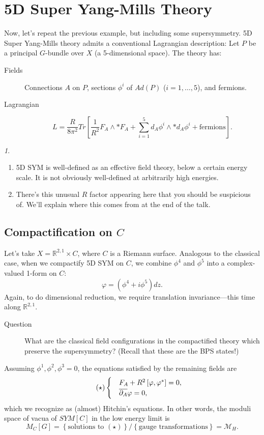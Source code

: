 \documentclass[oneside,english]{amsbook}
\numberwithin{section}{chapter}
\numberwithin{equation}{section}
\numberwithin{figure}{section}
\theoremstyle{plain}
\theoremstyle{definition}
\theoremstyle{remark}
\newtheorem*{rem*}{\protect\remarkname}
\theoremstyle{definition}
\theoremstyle{definition}
\theoremstyle{plain}
\providecommand{\remarkname}{Remark}
\begin{document}
\section{5D Super Yang-Mills Theory}

Now, let's repeat the previous example, but including some supersymmetry.
5D Super Yang-Mills theory admits a conventional Lagrangian description:
Let $P$ be a principal $G$-bundle over $X$ (a 5-dimensional space).
The theory has:
\begin{description}
\item [{Fields}] Connections $A$ on $P$, sections $\phi^{i}$ of $Ad\left(P\right)$
($i=1,\ldots,5$), and fermions.
\item [{Lagrangian}]
\[
L=\frac{R}{8\pi^{2}}Tr\left[\frac{1}{R^{2}}F_{A}\wedge*F_{A}+\sum_{i=1}^{5}d_{A}\phi^{i}\wedge*d_{A}\phi^{i}+\mbox{fermions}\right].
\]
\end{description}
\begin{rem*}
~
\begin{enumerate}
\item 5D SYM is well-defined as an effective field theory, below a certain
energy scale. It is not obviously well-defined at arbitrarily high
energies.
\item There's this unusual $R$ factor appearing here that you should be
suspicious of. We'll explain where this comes from at the end of the
talk.
\end{enumerate}
\end{rem*}

\subsection*{Compactification on $C$}

Let's take $X=\mathbb{R}^{2,1}\times C$, where $C$ is a Riemann
surface. Analogous to the classical case, when we compactify 5D SYM
on $C$, we combine $\phi^{4}$ and $\phi^{5}$ into a complex-valued
1-form on $C$:
\[
\varphi=\left(\phi^{4}+i\phi^{5}\right)dz.
\]
Again, to do dimensional reduction, we require translation invariance---this
time along $\mathbb{R}^{2,1}$.
\begin{description}
\item [{Question}] What are the classical field configurations in the compactified
theory which preserve the supersymmetry? (Recall that these are the
BPS states!)
\end{description}
Assuming $\phi^{1},\phi^{2},\phi^{3}=0$, the equations satisfied
by the remaining fields are
\[
\tag{\ensuremath{\star}}\begin{cases}
 & F_{A}+R^{2}\left[\varphi,\varphi^{*}\right]=0,\\
 & \overline{\partial_{A}}\varphi=0,
\end{cases}
\]
which we recognize as (almost) Hitchin's equations. In other words,
the moduli space of vacua of $SYM[C]$ in the low energy limit is
\[
M_{C}\left[G\right]=\left\{ \mbox{solutions to }(\star)\right\} /\left\{ \mbox{gauge transformations}\right\} =\mathcal{M}_{H}.
\]
\end{document}
